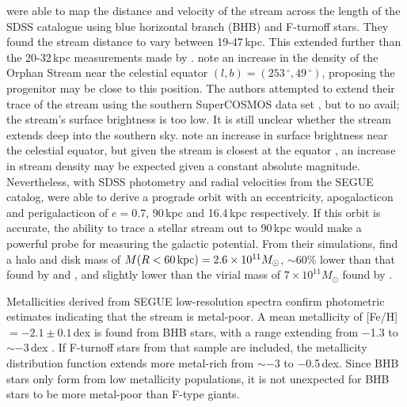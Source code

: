 \documentclass{emulateapj}
\begin{document}
\citet{newberg;et-al_2010} were able to map the distance and velocity of the stream across the length of the SDSS catalogue using blue horizontal branch (BHB) and F-turnoff stars. They found the stream distance to vary between 19-47\,kpc. This extended further than the 20-32\,kpc measurements made by \citet{belokurov;et-al_2007}. \citet{newberg;et-al_2010} note an increase in the density of the Orphan Stream near the celestial equator $(l, b) = (253\,^\circ, 49\,^\circ)$, proposing the progenitor may be close to this position. The authors attempted to extend their trace of the stream using the southern SuperCOSMOS data set \citep{supercosmos}, but to no avail; the stream's surface brightness is too low. It is still unclear whether the stream extends deep into the southern sky. \citet{newberg;et-al_2010} note an increase in surface brightness near the celestial equator, but given the stream is closest at the equator \citep{belokurov;et-al_2007}, an increase in stream density may be expected given a constant absolute magnitude. Nevertheless, with SDSS photometry and radial velocities from the SEGUE catalog, \citet{newberg;et-al_2010} were able to derive a prograde orbit with an eccentricity, apogalacticon and perigalacticon of $e = 0.7$, 90\,kpc and 16.4\,kpc respectively. If this orbit is accurate, the ability to trace a stellar stream out to 90\,kpc would make a powerful probe for measuring the galactic potential. From their simulations, \citet{newberg;et-al_2010} find a halo and disk mass of $M(R < 60\,{\rm kpc}) = 2.6 \times 10^{11} M_\odot$, $\sim$60\% lower than that found by \citet{xue;et-al_2008} and \citet{koposov;et-al_2008}, and slightly lower than the virial mass of $7 \times 10^{11} M_\odot$ found by \citet{sales;et-al_2008}.
 
Metallicities derived from SEGUE low-resolution spectra confirm photometric estimates indicating that the stream is metal-poor. A mean metallicity of [Fe/H]$ = -2.1 \pm 0.1$\,dex is found from BHB stars, with a range extending from $-$1.3 to $\sim-$3\,dex \citep{newberg;et-al_2010}. If F-turnoff stars from that sample are included, the metallicity distribution function extends more metal-rich from $\sim-$3 to $-$0.5\,dex. Since BHB stars only form from low metallicity populations, it is not unexpected for BHB stars to be more metal-poor than F-type giants. 
\end{document}
